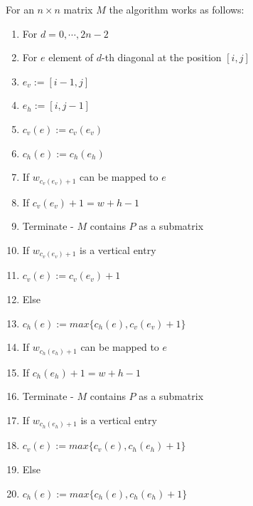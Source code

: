 For an $n\times n$ matrix $M$ the algorithm works as follows:
\begin{enumerate}
\item For $d=0,\cdots,2n-2$
\item \hspace{5mm} For $e$ element of $d$-th diagonal at the position $[i,j]$
\item \hspace{1cm} $e_v:=[i-1,j]$
\item \hspace{1cm} $e_h:=[i,j-1]$
\item \hspace{1cm} $c_v(e):=c_v(e_v)$
\item \hspace{1cm} $c_h(e):=c_h(e_h)$
\item \hspace{1cm} If $w_{c_v(e_v)+1}$ can be mapped to $e$
\item \hspace{15mm} If $c_v(e_v)+1=w+h-1$
\item \hspace{2cm} Terminate - $M$ contains $P$ as a submatrix
\item \hspace{15mm} If $w_{c_v(e_v)+1}$ is a vertical entry
\item \hspace{2cm} $c_v(e):=c_v(e_v)+1$
\item \hspace{15mm} Else
\item \hspace{2cm} $c_h(e):=max\{c_h(e),c_v(e_v)+1\}$
\item \hspace{1cm} If $w_{c_h(e_h)+1}$ can be mapped to $e$
\item \hspace{15mm} If $c_h(e_h)+1=w+h-1$
\item \hspace{2cm} Terminate - $M$ contains $P$ as a submatrix
\item \hspace{15mm} If $w_{c_h(e_h)+1}$ is a vertical entry
\item \hspace{2cm} $c_v(e):=max\{c_v(e),c_h(e_h)+1\}$
\item \hspace{15mm} Else
\item \hspace{2cm} $c_h(e):=max\{c_h(e),c_h(e_h)+1\}$
\end{enumerate}

